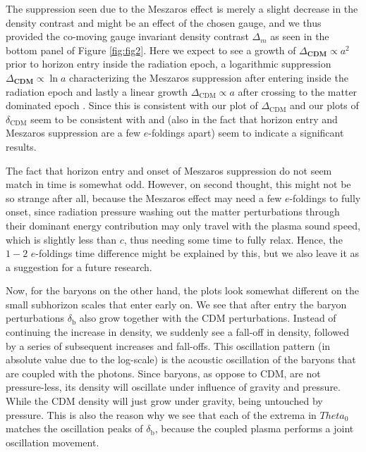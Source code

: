 \documentclass[twocolumn]{aastex62}
\begin{document}
The suppression seen due to the Meszaros effect is merely a slight decrease in the density contrast and might be an effect of the chosen gauge, and we thus provided the co-moving gauge invariant density contrast $\Delta_m$ as seen in the bottom panel of Figure \ref{fig:fig2}. Here we expect to see a growth of $\Delta_\textbf{CDM}\propto a^2$ prior to horizon entry inside the radiation epoch, a logarithmic suppression $\Delta_\textbf{CDM} \propto \ln a$ characterizing the Meszaros suppression after entering inside the radiation epoch and lastly a linear growth $\Delta_\text{CDM} \propto a$ after crossing to the matter dominated epoch \citep[p. 106]{baumann:2014}. Since this is consistent with our plot of $\Delta_\text{CDM}$ and our plots of $\delta_\text{CDM}$ seem to be consistent with \cite{dodelson:2003} and \cite{winther:2020b} (also in the fact that horizon entry and Meszaros suppression are a few $e$-foldings apart) seem to indicate a significant results. 

The fact that horizon entry and onset of Meszaros suppression do not seem match in time is somewhat odd. However, on second thought, this might not be so strange after all, because the Meszaros effect may need a few $e$-foldings to fully onset, since radiation pressure washing out the matter perturbations through their dominant energy contribution may only travel with the plasma sound speed, which is slightly less than $c$, thus needing some time to fully relax. Hence, the $1-2$ $e$-foldings time difference might be explained by this, but we also leave it as a suggestion for a future research.   

Now, for the baryons on the other hand, the plots look somewhat different on the small subhorizon scales that enter early on. We see that after entry the baryon perturbations $\delta_\text{b}$ also grow together with the CDM perturbations. Instead of continuing the increase in density, we suddenly see a fall-off in density, followed by a series of subsequent increases and fall-offs. This oscillation pattern (in absolute value due to the log-scale) is the acoustic oscillation of the baryons that are coupled with the photons. Since baryons, as oppose to CDM, are not pressure-less, its density will oscillate under influence of gravity and pressure. While the CDM density will just grow under gravity, being untouched by pressure. This is also the reason why we see that each of the extrema in $Theta_0$ matches the oscillation peaks of $\delta_\text{b}$, because the coupled plasma performs a joint oscillation movement. 
\end{document}
